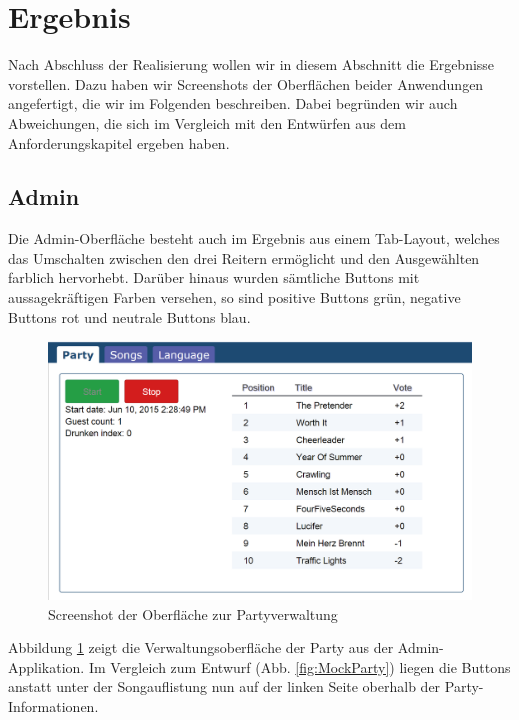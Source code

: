 \section{Ergebnis}
Nach Abschluss der Realisierung wollen wir in diesem Abschnitt die Ergebnisse vorstellen. Dazu haben wir Screenshots der Oberflächen beider Anwendungen angefertigt, die wir im Folgenden beschreiben. Dabei begründen wir auch Abweichungen, die sich im Vergleich mit den Entwürfen aus dem Anforderungskapitel ergeben haben.

\subsection{Admin}
Die Admin-Oberfläche besteht auch im Ergebnis aus einem Tab-Layout, welches das Umschalten zwischen den drei Reitern ermöglicht und den Ausgewählten farblich hervorhebt. Darüber hinaus wurden sämtliche Buttons mit aussagekräftigen Farben versehen, so sind positive Buttons grün, negative Buttons rot und neutrale Buttons blau.

\begin{figure}[H]
\centering
\includegraphics[width=0.9\linewidth]{Bilder/Screenshot-Admin-Party}
\caption{Screenshot der Oberfläche zur Partyverwaltung}
\label{fig:Screenshot-Admin-Party}
\end{figure}

Abbildung \ref{fig:Screenshot-Admin-Party} zeigt die Verwaltungsoberfläche der Party aus der Admin-Applikation. Im Vergleich zum Entwurf (Abb. \ref{fig:MockParty}) liegen die Buttons anstatt unter der Songauflistung nun auf der linken Seite oberhalb der Party-Informationen.

